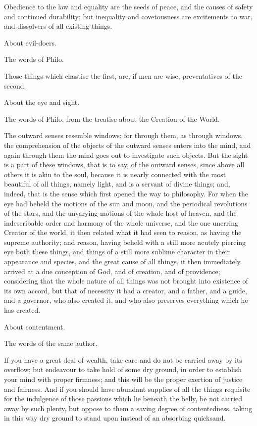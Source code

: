 Obedience to the law and equality are the seeds of peace, and the causes of safety and continued
durability; but inequality and covetousness are excitements to war, and dissolvers of all existing
things.

About evil-doers.

The words of Philo.

Those things which chastise the first, are, if men are wise, preventatives of the second.

About the eye and sight.

The words of Philo, from the treatise about the Creation of the World.

The outward senses resemble windows; for through them, as through windows, the comprehension
of the objects of the outward senses enters into the mind, and again through them the mind goes
out to investigate such objects. But the sight is a part of these windows, that is to say, of the
outward senses, since above all others it is akin to the soul, because it is nearly connected with the
most beautiful of all things, namely light, and is a servant of divine things; and, indeed, that is the
sense which first opened the way to philosophy. For when the eye had beheld the motions of the
sun and moon, and the periodical revolutions of the stars, and the unvarying motions of the whole
host of heaven, and the indescribable order and harmony of the whole universe, and the one
unerring Creator of the world, it then related what it had seen to reason, as having the supreme
authority; and reason, having beheld with a still more acutely piercing eye both these things, and
things of a still more sublime character in their appearance and species, and the great cause of all
things, it then immediately arrived at a due conception of God, and of creation, and of providence;
considering that the whole nature of all things was not brought into existence of its own accord, but
that of necessity it had a creator, and a father, and a guide, and a governor, who also created it,
and who also preserves everything which he has created.

About contentment.

The words of the same author.

If you have a great deal of wealth, take care and do not be carried away by its overflow; but
endeavour to take hold of some dry ground, in order to establish your mind with proper firmness;
and this will be the proper exertion of justice and fairness. And if you should have abundant
supplies of all the things requisite for the indulgence of those passions which lie beneath the belly,
be not carried away by such plenty, but oppose to them a saving degree of contentedness, taking
in this way dry ground to stand upon instead of an absorbing quicksand.


